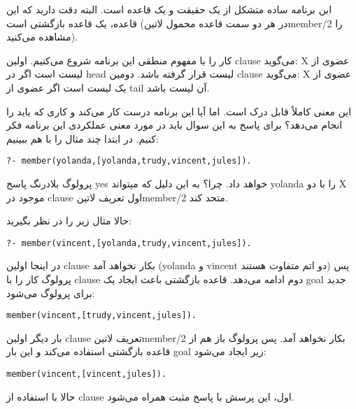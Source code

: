 این برنامه ساده متشکل از یک حقیقت و یک قاعده است. البته دقت دارید که این قاعده، یک قاعده بازگشتی است (در هر دو سمت قاعده محمول ‌لاتین{member/2} را مشاهده می‌کنید).

کار را با مفهوم منطقی این برنامه شروع می‌کنیم. اولین clause می‌گوید: X عضوی از لیست است اگر در head لیست قرار گرفته باشد. دومین clause می‌گوید: X عضوی از یک لیست است اگر عضوی از tail آن لیست باشد.

این معنی کاملاً قابل درک است. اما آیا این برنامه درست کار می‌کند و کاری که باید را انجام می‌دهد؟ برای پاسخ به این سوال باید در مورد معنی عملکردی این برنامه فکر کنیم. در ابتدا چند مثال را با هم ببینیم:

\begin{latin}
\begin{lstlisting}
?- member(yolanda,[yolanda,trudy,vincent,jules]).
\end{lstlisting}
\end{latin}

پرولوگ بلادرنگ پاسخ yes خواهد داد. چرا؟ به این دلیل که میتواند yolanda را با دو X موجود در clause اول تعریف ‌لاتین{member/2} متحد کند.

حالا مثال زیر را در نظر بگیرید:

\begin{latin}
\begin{lstlisting}
?- member(vincent,[yolanda,trudy,vincent,jules]).
\end{lstlisting}
\end{latin}

در اینجا اولین clause بکار نخواهد آمد (yolanda و vincent دو اتم متفاوت هستند) پس پرولوگ کار را با clause دوم ادامه می‌دهد. قاعده بازگشتی باعث ایجاد یک goal جدید برای پرولوگ می‌شود:

\begin{latin}
\begin{lstlisting}
member(vincent,[trudy,vincent,jules]).
\end{lstlisting}
\end{latin}

بار دیگر اولین clause تعریف ‌لاتین{member/2} بکار نخواهد آمد. پس پرولوگ باز هم از قاعده بازگشتی استفاده می‌کند و این بار goal زیر ایجاد می‌شود:

\begin{latin}
\begin{lstlisting}
member(vincent,[vincent,jules]).
\end{lstlisting}
\end{latin}

حالا با استفاده از clause اول، این پرسش با پاسخ مثبت همراه می‌شود.

